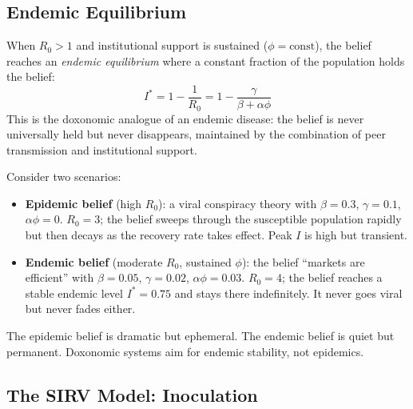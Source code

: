 \subsection{Endemic Equilibrium}

\begin{proposition}
\label{prop:endemic}
When $R_0 > 1$ and institutional support is sustained ($\phi = \text{const}$), the belief reaches an \emph{endemic equilibrium} where a constant fraction of the population holds the belief:
\[
  I^* = 1 - \frac{1}{R_0} = 1 - \frac{\gamma}{\beta + \alpha\phi}
\]
This is the doxonomic analogue of an endemic disease: the belief is never universally held but never disappears, maintained by the combination of peer transmission and institutional support.
\end{proposition}

\begin{example}
\label{ex:endemic}
Consider two scenarios:
\begin{itemize}[nosep]
  \item \textbf{Epidemic belief} (high $R_0$): a viral conspiracy theory with $\beta = 0.3$, $\gamma = 0.1$, $\alpha\phi = 0$.
  $R_0 = 3$; the belief sweeps through the susceptible population rapidly but then decays as the recovery rate takes effect.
  Peak $I$ is high but transient.
  \item \textbf{Endemic belief} (moderate $R_0$, sustained $\phi$): the belief ``markets are efficient'' with $\beta = 0.05$, $\gamma = 0.02$, $\alpha\phi = 0.03$.
  $R_0 = 4$; the belief reaches a stable endemic level $I^* = 0.75$ and stays there indefinitely.
  It never goes viral but never fades either.
\end{itemize}
The epidemic belief is dramatic but ephemeral.
The endemic belief is quiet but permanent.
Doxonomic systems aim for endemic stability, not epidemics.
\end{example}

\subsection{The SIRV Model: Inoculation}

